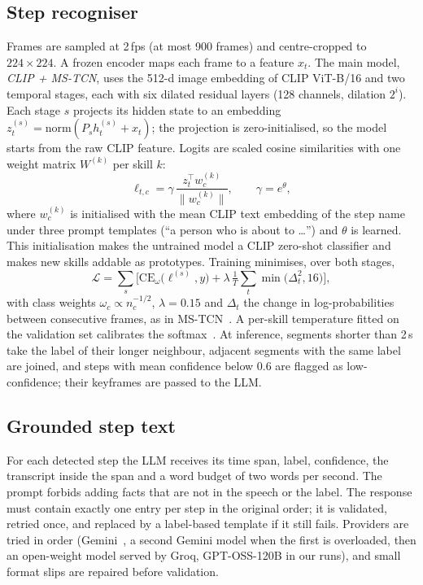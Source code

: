 \documentclass[conference]{IEEEtran}
\begin{document}
\subsection{Step recogniser}
Frames are sampled at 2\,fps (at most 900 frames) and centre-cropped to $224\times224$. A frozen encoder maps each frame
to a feature $x_t$. The main model, \emph{CLIP + MS-TCN}, uses the 512-d image embedding of CLIP ViT-B/16 and two
temporal stages, each with six dilated residual layers (128 channels, dilation $2^i$). Each stage $s$ projects its
hidden state to an embedding $z^{(s)}_t = \mathrm{norm}(P_s h^{(s)}_t + x_t)$; the projection is zero-initialised, so the
model starts from the raw CLIP feature. Logits are scaled cosine similarities with one weight matrix $W^{(k)}$ per skill
$k$:
\begin{equation}
\ell_{t,c} = \gamma \, \frac{z_t^\top w^{(k)}_c}{\lVert w^{(k)}_c\rVert}, \qquad \gamma = e^{\theta},
\end{equation}
where $w^{(k)}_c$ is initialised with the mean CLIP text embedding of the step name under three prompt templates
(``a person who is about to \ldots'') and $\theta$ is learned. This initialisation makes the untrained model a CLIP
zero-shot classifier and makes new skills addable as prototypes. Training minimises, over both stages,
\begin{equation}
\mathcal{L} = \sum_{s}\Big[\mathrm{CE}_{\omega}\big(\ell^{(s)}, y\big) + \lambda \,\tfrac{1}{T}\sum_{t}\min\big(\Delta_{t}^{2}, 16\big)\Big],
\end{equation}
with class weights $\omega_c \propto n_c^{-1/2}$, $\lambda = 0.15$ and $\Delta_t$ the change in log-probabilities between
consecutive frames, as in MS-TCN~\cite{farha2019mstcn}. A per-skill temperature fitted on the validation set calibrates
the softmax~\cite{guo2017calibration}. At inference, segments shorter than 2\,s take the label of their longer
neighbour, adjacent segments with the same label are joined, and steps with mean confidence below 0.6 are flagged as
low-confidence; their keyframes are passed to the LLM.

\subsection{Grounded step text}
For each detected step the LLM receives its time span, label, confidence, the transcript inside the span and a word
budget of two words per second. The prompt forbids adding facts that are not in the speech or the label. The response
must contain exactly one entry per step in the original order; it is validated, retried once, and replaced by a
label-based template if it still fails. Providers are tried in order (Gemini~\cite{gemini2023}, a second Gemini model
when the first is overloaded, then an open-weight model served by Groq, GPT-OSS-120B in our runs), and small format slips are repaired before validation.
\end{document}
